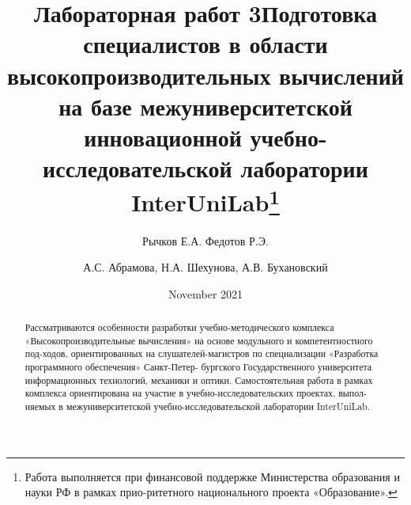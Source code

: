 \documentclass[11pt]{article}
\title{Лабораторная работ 3}
\author{Рычков Е.А. Федотов Р.Э.}
\date{November 2021}
\begin{document}
\title{\textbf{Подготовка специалистов в области
высокопроизводительных вычислений на базе
межуниверситетской инновационной
учебно-исследовательской лаборатории InterUniLab\footnote{Работа выполняется при финансовой поддержке Министерства образования и науки РФ в рамках прио-ритетного национального проекта «Образование».}}
}
\author{А.С. Абрамова, Н.А. Шехунова, А.В. Бухановский}
\date{}
\maketitle
\thispagestyle{fancy}
\fancyhf{}
\lfoot{\thepage}
\cfoot{\today}
\rfoot{\currfilename}
\begin{abstract}
    Рассматриваются особенности разработки учебно-методического комплекса «Высокопроизводи\-тельные вычисления» на основе модульного и компетентностного под-ходов, ориентированных на слушателей-магистров по специализации «Разработка программного обеспечения» Санкт-Петер- \-бургского Государственного университета информационных технологий, механики и оптики. Самостоятельная работа в рамках комплекса ориентирована на участие в учебно-исследовательских проектах, выпол-няемых в межуниверситетской учебно-исследовательской лаборатории InterUniLab.
\end{abstract}
\end{document}
